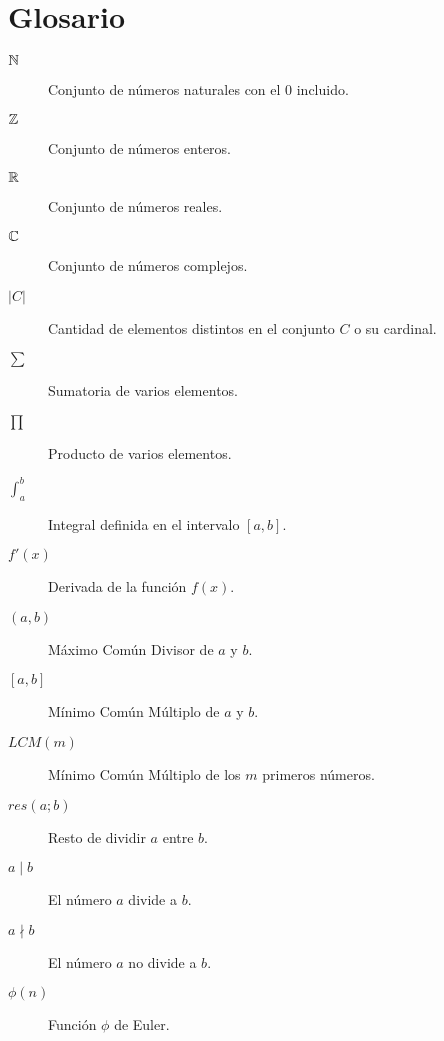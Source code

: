 
\chapter*{Glosario}

\begin{description}
	\item[$\mathbb{N}$] Conjunto de números naturales con el $0$ incluido.
	
	\item[$\mathbb{Z}$] Conjunto de números enteros.
	
	\item[$\mathbb{R}$] Conjunto de números reales.
	
	\item[$\mathbb{C}$] Conjunto de números complejos.
	
	\item[$|C|$] Cantidad de elementos distintos en el conjunto $C$ o su cardinal.
	
	\item[$\sum$] Sumatoria de varios elementos.
	
	\item[$\prod$] Producto de varios elementos.
	
	\item[$\int_{a}^{b}$] Integral definida en el intervalo $[a, b]$.
	
	\item[$f'(x)$] Derivada de la función $f(x)$.
	
	\item[$(a, b)$] Máximo Común Divisor de $a$ y $b$.
	
	\item[${[a, b]}$] Mínimo Común Múltiplo de $a$ y $b$.
	
	\item[$LCM(m)$] Mínimo Común Múltiplo de los $m$ primeros números.
	
	\item[$res(a; b)$] Resto de dividir $a$ entre $b$.
	
	\item[$a\mid b$] El número $a$ divide a $b$.
	
	\item[$a\nmid b$] El número $a$ no divide a $b$.
	
	\item[$\phi(n)$] Función $\phi$ de Euler.
	

\end{description}
